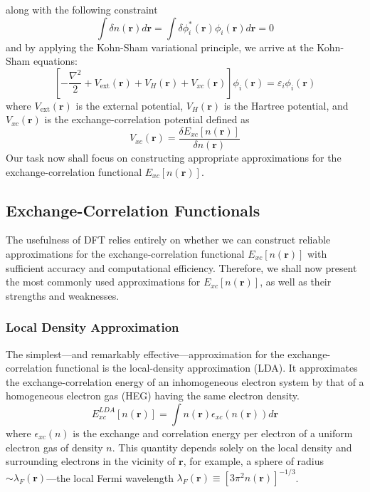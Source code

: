 along with the following constraint 
\begin{equation}
  \int \delta n(\mathbf{r}) d\mathbf{r} = \int \delta \phi_i^*(\mathbf{r}) \phi_i(\mathbf{r}) d\mathbf{r} = 0
  \label{eq55}
\end{equation}
and by applying the Kohn-Sham variational principle, we arrive at the Kohn-Sham equations: 
\begin{equation}
  \label{eq56}
  \left[-\frac{\nabla^2}{2} + V_{\text{ext}}(\mathbf{r}) + V_H(\mathbf{r}) + V_{xc}(\mathbf{r})\right]\phi_i(\mathbf{r}) = \varepsilon_i \phi_i(\mathbf{r})
\end{equation}
where $V_{\text{ext}}(\mathbf{r})$ is the external potential, $V_H(\mathbf{r})$ is the Hartree potential, and $V_{xc}(\mathbf{r})$ is the exchange-correlation potential defined as 
\begin{equation}
  \label{eq57}
  V_{xc}(\mathbf{r}) = \frac{\delta E_{xc}[n(\mathbf{r})]}{\delta n(\mathbf{r})}
\end{equation}
Our task now shall focus on constructing appropriate approximations for the exchange-correlation functional $E_{xc}[n(\mathbf{r})]$. 

\subsection{Exchange-Correlation Functionals}
The usefulness of DFT relies entirely on whether we can construct reliable approximations for the exchange-correlation functional $E_{xc}[n(\mathbf{r})]$ with sufficient accuracy and computational efficiency. Therefore, we shall now present the most commonly used approximations for $E_{xc}[n(\mathbf{r})]$, as well as their strengths and weaknesses.  
\subsubsection{Local Density Approximation}
The simplest---and remarkably effective---approximation for the exchange-correlation functional is the local-density approximation (LDA)\supercite{Kohn1999}. It approximates the exchange-correlation energy of an inhomogeneous electron system by that of a homogeneous electron gas (HEG) having the same electron density. 
\begin{equation}
  \label{eq58}
  E_{xc}^{LDA}[n(\mathbf{r})] = \int n(\mathbf{r}) \epsilon_{xc}(n(\mathbf{r})) d\mathbf{r}
\end{equation}
where $\epsilon_{xc}(n)$  is the exchange and correlation energy per electron of a uniform electron gas of density $n$\supercite{Hohenberg1964, Kohn1965}. This quantity depends solely on the local density and surrounding electrons in the vicinity of $\mathbf{r}$, for example, a sphere of radius $\sim\lambda_F(\mathbf{r})$---the local Fermi wavelength\supercite{feng2005introduction} $\lambda_F(\mathbf{r})\equiv[3\pi^2 n(\mathbf{r})]^{-1/3}$.

